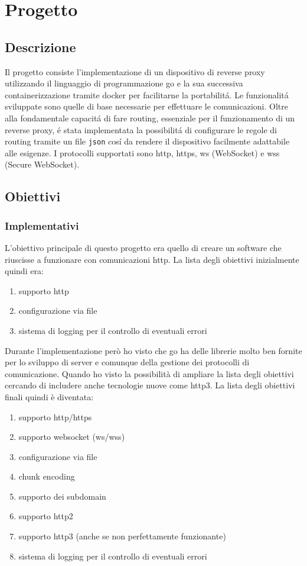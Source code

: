 \chapter{Progetto}
\label{cha:Progetto}

\section{Descrizione}
Il progetto consiste l'implementazione di un dispositivo di reverse proxy utilizzando il linguaggio di programmazione go e la sua successiva containerizzazione tramite docker per facilitarne la portabilitá. Le funzionalitá sviluppate sono quelle di base necessarie per effettuare le comunicazioni. Oltre alla fondamentale capacitá di fare routing, essenziale per il funzionamento di un reverse proxy, é stata implementata la possibilitá di configurare le regole di routing tramite un file \texttt{json} cosí da rendere il dispositivo facilmente adattabile alle esigenze. I protocolli supportati sono http, https, ws (WebSocket) e wss (Secure WebSocket).
\section{Obiettivi}
\subsection{Implementativi}
L'obiettivo principale di questo progetto era quello di creare un software che riuscisse a funzionare con comunicazioni http. La lista degli obiettivi inizialmente quindi era:
\begin{enumerate}
  \item supporto http
  \item configurazione via file
  \item sistema di logging per il controllo di eventuali errori
\end{enumerate}
Durante l'implementazione però ho visto che go ha delle librerie molto ben fornite per lo sviluppo di server e comunque della gestione dei protocolli di comunicazione. Quando ho visto la possibilità di ampliare la lista degli obiettivi cercando di includere anche tecnologie nuove come http3. La lista degli obiettivi finali quindi è diventata:
\begin{enumerate}
  \item supporto http/https
  \item supporto websocket (ws/wss)
  \item configurazione via file
  \item chunk encoding
  \item supporto dei subdomain
  \item supporto http2
  \item supporto http3 (anche se non perfettamente funzionante)
  \item sistema di logging per il controllo di eventuali errori
\end{enumerate}

